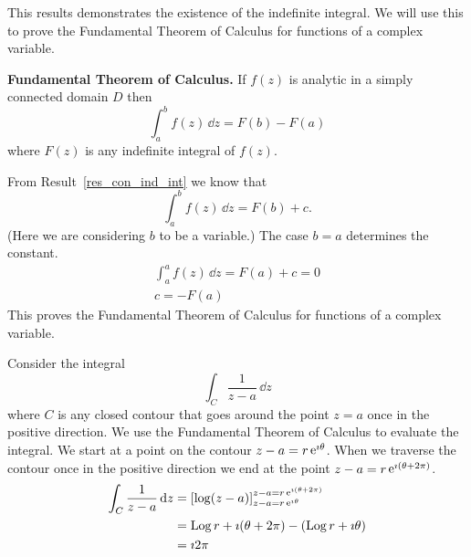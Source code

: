 This results demonstrates the existence of the indefinite integral.
We will use this to prove the Fundamental Theorem of Calculus for 
functions of a complex variable.










\begin{Result}
  \textbf{Fundamental Theorem of Calculus.}
  If $f(z)$ is analytic in a simply connected domain $D$ then
  \[
  \int_a^b f(z) \,\dd z = F(b) - F(a)
  \]
  where $F(z)$ is any indefinite integral of $f(z)$.
\end{Result}


From Result~\ref{res_con_ind_int} we know that
\[
\int_a^b f(z) \,\dd z = F(b) + c.
\]
(Here we are considering $b$ to be a variable.)
The case $b = a$ determines the constant.
\begin{gather*}
  \int_a^a f(z) \,\dd z = F(a) + c = 0 
  \\
  c = - F(a)
\end{gather*}
This proves the Fundamental Theorem of Calculus for functions of a 
complex variable.






\begin{Example}
  \label{ex_int1za}
  Consider the integral 
  \[
  \int_C \frac{1}{z - a} \,\dd z
  \]
  where $C$ is any closed contour that goes around the point $z = a$ once
  in the positive direction.  We use the Fundamental Theorem of Calculus to 
  evaluate the integral.  We start at a point on the contour 
  $z - a = r \mathop{\mathrm{e}}\nolimits^{\imath \theta}$.  When we traverse the contour once in the positive 
  direction we end at the point $z - a = r \mathop{\mathrm{e}}\nolimits^{\imath (\theta+2 \pi)}$. 
  \begin{align*}
    \int_C \frac{1}{z - a} \,\mathrm{d} z
    &= \left[ \log(z - a) \right]_{z - a = r \mathop{\mathrm{e}}\nolimits^{\imath \theta}}^{z - a = r \mathop{\mathrm{e}}\nolimits^{\imath (\theta+2 \pi)}} 
    \\
    &= \mathop{\mathrm{Log}}\nolimits r + \imath (\theta + 2 \pi) - (\mathop{\mathrm{Log}}\nolimits r + \imath \theta) 
    \\
    &= \imath 2 \pi
  \end{align*}
\end{Example}










